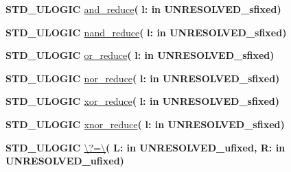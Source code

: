 \begin{DoxyCompactItemize}
\item 
{\bfseries {\bfseries \textcolor{comment}{S\+T\+D\+\_\+\+U\+L\+O\+G\+I\+C}\textcolor{vhdlchar}{ }}} \hyperlink{class__fixed__pkg_ab127ad18d0e5b9a38b09dfeeb23f2809}{and\+\_\+reduce}{\bfseries  ( }{\bfseries \textcolor{vhdlchar}{l\+: }\textcolor{stringliteral}{in }\textcolor{vhdlchar}{U\+N\+R\+E\+S\+O\+L\+V\+E\+D\+\_\+sfixed}}{\bfseries  )} 
\item 
{\bfseries {\bfseries \textcolor{comment}{S\+T\+D\+\_\+\+U\+L\+O\+G\+I\+C}\textcolor{vhdlchar}{ }}} \hyperlink{class__fixed__pkg_adce82fa7ec9d1f061f5d6b3dc67d583d}{nand\+\_\+reduce}{\bfseries  ( }{\bfseries \textcolor{vhdlchar}{l\+: }\textcolor{stringliteral}{in }\textcolor{vhdlchar}{U\+N\+R\+E\+S\+O\+L\+V\+E\+D\+\_\+sfixed}}{\bfseries  )} 
\item 
{\bfseries {\bfseries \textcolor{comment}{S\+T\+D\+\_\+\+U\+L\+O\+G\+I\+C}\textcolor{vhdlchar}{ }}} \hyperlink{class__fixed__pkg_adee70e282d92bddd3959ca7436fdfb87}{or\+\_\+reduce}{\bfseries  ( }{\bfseries \textcolor{vhdlchar}{l\+: }\textcolor{stringliteral}{in }\textcolor{vhdlchar}{U\+N\+R\+E\+S\+O\+L\+V\+E\+D\+\_\+sfixed}}{\bfseries  )} 
\item 
{\bfseries {\bfseries \textcolor{comment}{S\+T\+D\+\_\+\+U\+L\+O\+G\+I\+C}\textcolor{vhdlchar}{ }}} \hyperlink{class__fixed__pkg_a807bcfdd90aa99257feb3c93cb068e79}{nor\+\_\+reduce}{\bfseries  ( }{\bfseries \textcolor{vhdlchar}{l\+: }\textcolor{stringliteral}{in }\textcolor{vhdlchar}{U\+N\+R\+E\+S\+O\+L\+V\+E\+D\+\_\+sfixed}}{\bfseries  )} 
\item 
{\bfseries {\bfseries \textcolor{comment}{S\+T\+D\+\_\+\+U\+L\+O\+G\+I\+C}\textcolor{vhdlchar}{ }}} \hyperlink{class__fixed__pkg_a89bc2be1fa542184cf07e7c65187b945}{xor\+\_\+reduce}{\bfseries  ( }{\bfseries \textcolor{vhdlchar}{l\+: }\textcolor{stringliteral}{in }\textcolor{vhdlchar}{U\+N\+R\+E\+S\+O\+L\+V\+E\+D\+\_\+sfixed}}{\bfseries  )} 
\item 
{\bfseries {\bfseries \textcolor{comment}{S\+T\+D\+\_\+\+U\+L\+O\+G\+I\+C}\textcolor{vhdlchar}{ }}} \hyperlink{class__fixed__pkg_ab6ceee79204a420850ad9e7876dc0ec4}{xnor\+\_\+reduce}{\bfseries  ( }{\bfseries \textcolor{vhdlchar}{l\+: }\textcolor{stringliteral}{in }\textcolor{vhdlchar}{U\+N\+R\+E\+S\+O\+L\+V\+E\+D\+\_\+sfixed}}{\bfseries  )} 
\item 
{\bfseries {\bfseries \textcolor{comment}{S\+T\+D\+\_\+\+U\+L\+O\+G\+I\+C}\textcolor{vhdlchar}{ }}} \hyperlink{class__fixed__pkg_a8cb13e21bf841bcb05f30767ad54c888}{\textbackslash{}?=\textbackslash{}}{\bfseries  ( }{\bfseries \textcolor{vhdlchar}{L\+: }\textcolor{stringliteral}{in }\textcolor{vhdlchar}{U\+N\+R\+E\+S\+O\+L\+V\+E\+D\+\_\+ufixed}}{\bfseries  , \textcolor{vhdlchar}{R\+: }\textcolor{stringliteral}{in }\textcolor{vhdlchar}{U\+N\+R\+E\+S\+O\+L\+V\+E\+D\+\_\+ufixed}}{\bfseries  )} 

\end{DoxyCompactItemize}
